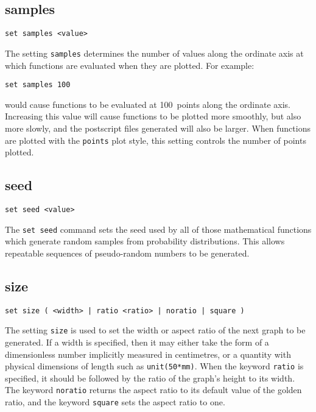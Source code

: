 \subsection{samples}

\begin{verbatim}
set samples <value>
\end{verbatim}

The setting {\tt samples} determines the number of values along the ordinate
axis at which functions are evaluated when they are plotted. For example:

\begin{verbatim}
set samples 100
\end{verbatim}

\noindent would cause functions to be evaluated at 100~points along the
ordinate axis.  Increasing this value will cause functions to be plotted more
smoothly, but also more slowly, and the postscript files generated will also be
larger. When functions are plotted with the {\tt points} plot style, this
setting controls the number of points plotted.


\subsection{seed}

\begin{verbatim}
set seed <value>
\end{verbatim}

The {\tt set seed} command sets the seed used by all of those mathematical
functions which generate random samples from probability distributions.  This
allows repeatable sequences of pseudo-random numbers to be generated.


\subsection{size}

\begin{verbatim}
set size ( <width> | ratio <ratio> | noratio | square )
\end{verbatim}

The setting {\tt size} is used to set the width or aspect ratio of the next
graph to be generated. If a width is specified, then it may either take the
form of a dimensionless number implicitly measured in centimetres, or a
quantity with physical dimensions of length such as {\tt unit(50*mm)}. When the
keyword {\tt ratio} is specified, it should be followed by the ratio of the
graph's height to its width. The keyword {\tt noratio} returns the aspect ratio
to its default value of the golden ratio, and the keyword {\tt square} sets the
aspect ratio to one.


